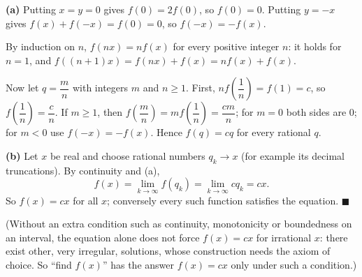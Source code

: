 \textbf{(a)} Putting $x=y=0$ gives $f(0)=2f(0)$, so $f(0)=0$. Putting $y=-x$ gives $f(x)+f(-x)=f(0)=0$, so $f(-x)=-f(x)$.

By induction on $n$, $f(nx)=nf(x)$ for every positive integer $n$: it holds for $n=1$, and $f((n+1)x)=f(nx)+f(x)=nf(x)+f(x)$.

Now let $q=\dfrac {m}{n}$ with integers $m$ and $n\ge1$. First, $nf\!\left(\dfrac{1}{n}\right)=f(1)=c$, so $f\!\left(\dfrac{1}{n}\right)=\dfrac {c}{n}$. If $m\ge1$, then $f\!\left(\dfrac {m}{n}\right)=mf\!\left(\dfrac{1}{n}\right)=\dfrac{cm}{n}$; for $m=0$ both sides are $0$; for $m<0$ use $f(-x)=-f(x)$. Hence $f(q)=cq$ for every rational $q$.

\textbf{(b)} Let $x$ be real and choose rational numbers $q_k\to x$ (for example its decimal truncations). By continuity and (a),
\[
f(x)=\lim_{k\to\infty}f(q_k)=\lim_{k\to\infty}cq_k=cx .
\]
So $f(x)=cx$ for all $x$; conversely every such function satisfies the equation. $\blacksquare$

(Without an extra condition such as continuity, monotonicity or boundedness on an interval, the equation alone does not force $f(x)=cx$ for irrational $x$: there exist other, very irregular, solutions, whose construction needs the axiom of choice. So ``find $f(x)$'' has the answer $f(x)=cx$ only under such a condition.)
